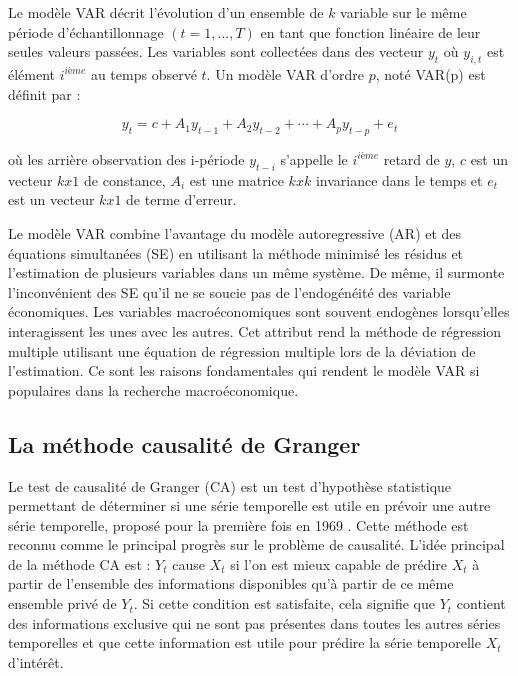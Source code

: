 Le modèle VAR décrit l'évolution d'un ensemble de $k$ variable sur le même période d'échantillonnage $(t = 1,..., T)$ en tant que fonction linéaire de leur seules valeurs passées.  Les variables sont collectées dans des vecteur $y_t$ où $y_{i,t}$ est élément $i^{ième}$ au temps  observé $t$. Un modèle VAR d'ordre $p$, noté VAR(p) est définit par : 

$$y_t = c + A_{1}y_{t-1} + A_{2}y_{t-2} + \cdots + A_{p}y_{t-p} + e_t $$

où les arrière observation des i-période $y_{t-i}$ s'appelle le $i^{ième}$ retard de $y$, $c$ est un vecteur $k x 1$ de constance, $A_i$ est une matrice $k x k$ invariance dans le temps et $e_t$ est un vecteur $k x 1$ de terme d'erreur.

Le modèle VAR combine l'avantage du modèle autoregressive (AR) et des équations simultanées (SE)  en utilisant  la méthode minimisé les résidus et l'estimation de plusieurs variables dans un même système. De même, il surmonte l'inconvénient des SE qu'il ne se soucie pas de l'endogénéité des variable économiques. Les variables macroéconomiques sont souvent endogènes lorsqu'elles interagissent les unes avec les autres. Cet attribut rend la méthode de régression multiple utilisant une équation de régression multiple lors de la déviation de l'estimation. Ce sont les raisons fondamentales qui rendent le modèle VAR si populaires dans la recherche macroéconomique.

\subsection{La méthode causalité de Granger}
Le test de causalité de Granger (CA) est un test d'hypothèse statistique permettant de déterminer si une série temporelle est utile en prévoir une autre série temporelle, proposé pour la première fois en 1969 \cite{granger1969}. Cette méthode est reconnu comme le principal progrès sur le problème de causalité. L'idée principal de la méthode CA est : $Y_t$ cause $X_t$ si l’on est mieux capable de prédire $X_t$ à partir de l’ensemble des informations disponibles qu’à partir de ce même ensemble privé de $Y_t$\cite{granger1969,granger1980}. Si cette condition est satisfaite, cela signifie que $Y_t$ contient des informations exclusive qui ne sont pas présentes dans toutes les autres séries temporelles et que cette information est utile pour prédire la série temporelle $X_t$ d'intérêt. 

